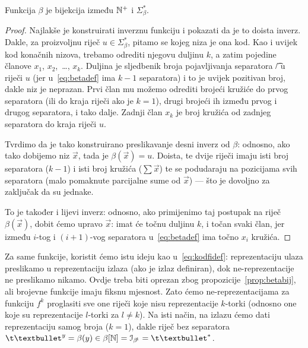 \begin{propozicija}[{name=[bijektivnost binarne reprezentacije]}]\label{prop:betabij}
Funkcija $\beta$ je bijekcija između ${\mathbb N}^+$ i $\Sigma_\beta^*$.
\end{propozicija}
\begin{proof}
Najlakše je konstruirati inverznu funkciju i pokazati da je to doista inverz. Dakle, za proizvoljnu riječ $u\in\Sigma_\beta^*$, pitamo se kojeg niza je ona kod. Kao i uvijek kod konačnih nizova, trebamo odrediti njegovu duljinu $k$, a zatim pojedine članove $x_1$, $x_2$,~\ldots, $x_k$. Duljina je sljedbenik broja pojavljivanja separatora \t/ u riječi $u$ (jer u~\eqref{eq:betadef} ima $k-1$ separatora) i to je uvijek pozitivan broj, dakle niz je neprazan. Prvi član mu možemo odrediti brojeći kružiće do prvog separatora (ili do kraja riječi ako je $k=1$), drugi brojeći ih između prvog i drugog separatora, i tako dalje. Zadnji član $x_k$ je broj kružića od zadnjeg separatora do kraja riječi $u$.

Tvrdimo da je tako konstruirano preslikavanje desni inverz od $\beta$: odnosno, ako tako dobijemo niz $\vec x$, tada je $\beta(\vec x)=u$. Doista, te dvije riječi imaju isti broj separatora ($k-1$) i isti broj kružića ($\sum\vec x$) te se podudaraju na pozicijama svih separatora (malo pomaknute parcijalne sume od $\vec x$) --- što je dovoljno za zaključak da su jednake.

To je također i lijevi inverz: odnosno, ako primijenimo taj postupak na riječ $\beta(\vec x)$, dobit ćemo upravo $\vec x$: imat će točnu duljinu $k$, i točan svaki član, jer između $i$-tog i $(i+1)$-vog separatora u~\eqref{eq:betadef} ima točno $x_i$ kružića.
\end{proof}

Za same funkcije, koristit ćemo istu ideju kao u~\eqref{eq:kodfidef}: reprezentaciju ulaza preslikamo u reprezentaciju izlaza (ako je izlaz definiran), dok ne-reprezentacije ne preslikamo nikamo. Ovdje treba biti oprezan zbog propozicije~\ref{prop:betabij}, ali brojevne funkcije imaju fiksnu mjesnost. Zato ćemo ne-reprezentacijama za funkciju $f^k$ proglasiti sve one riječi koje nisu reprezentacije $k$-torki (odnosno one koje su reprezentacije $l$-torki za $l\ne k$). Na isti način, na izlazu ćemo dati reprezentaciju samog broja ($k=1$), dakle riječ bez separatora $\t\textbullet^y=\beta(y)\in\beta[\N]=\im{\beta^{\!1}}=\t\textbullet^*$.

